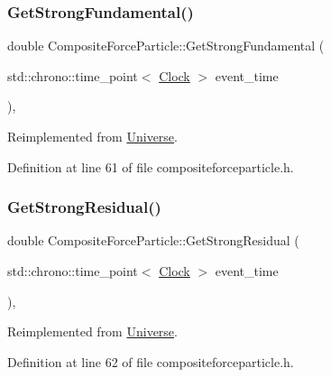 \subsubsection{\texorpdfstring{Get\+Strong\+Fundamental()}{GetStrongFundamental()}}
{\footnotesize\ttfamily double Composite\+Force\+Particle\+::\+Get\+Strong\+Fundamental (\begin{DoxyParamCaption}\item[{std\+::chrono\+::time\+\_\+point$<$ \mbox{\hyperlink{universe_8h_a0ef8d951d1ca5ab3cfaf7ab4c7a6fd80}{Clock}} $>$}]{event\+\_\+time }\end{DoxyParamCaption})\hspace{0.3cm}{\ttfamily [inline]}, {\ttfamily [virtual]}}



Reimplemented from \mbox{\hyperlink{class_universe_ab44daccba01ee7e3cf9b50bba83dd19e}{Universe}}.



Definition at line 61 of file compositeforceparticle.\+h.

\mbox{\label{class_composite_force_particle_a24214566eb5b44340d5563b6583052e8}} 
\subsubsection{\texorpdfstring{Get\+Strong\+Residual()}{GetStrongResidual()}}
{\footnotesize\ttfamily double Composite\+Force\+Particle\+::\+Get\+Strong\+Residual (\begin{DoxyParamCaption}\item[{std\+::chrono\+::time\+\_\+point$<$ \mbox{\hyperlink{universe_8h_a0ef8d951d1ca5ab3cfaf7ab4c7a6fd80}{Clock}} $>$}]{event\+\_\+time }\end{DoxyParamCaption})\hspace{0.3cm}{\ttfamily [inline]}, {\ttfamily [virtual]}}



Reimplemented from \mbox{\hyperlink{class_universe_af0f4b81950061e63c2855eb40957a5b1}{Universe}}.



Definition at line 62 of file compositeforceparticle.\+h.

\mbox{\label{class_composite_force_particle_ab5cc0893a4063cc353ea5d2404f27b0b}} 

